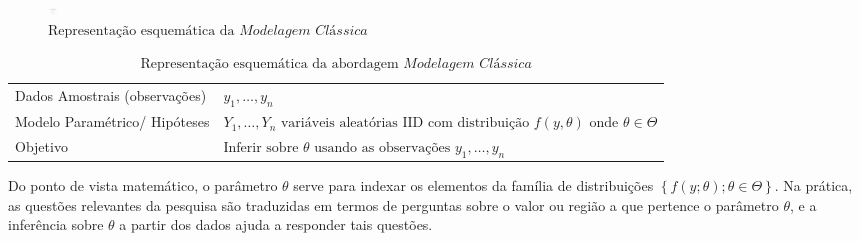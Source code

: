 \documentclass[
  12pt,
  brazilian,
]{book}
\theoremstyle{definition}
\theoremstyle{definition}
\theoremstyle{definition}
\theoremstyle{definition}
\theoremstyle{remark}
\begin{document}
\begin{figure}

{\centering \includegraphics[width=10,6in]{Figuras/Figura2.1} 

}

\caption{$\text{Representação esquemática da }\textit{Modelagem Clássica}$}\label{fig:modclas}
\end{figure}

\begin{table}[H]

\caption{\label{tab:modelclass}$\text{Representação esquemática da abordagem }\textit{Modelagem Clássica}$}
\centering
\begin{tabular}[t]{>{\raggedright\arraybackslash}p{4.5cm}l}
\toprule
Dados Amostrais (observações) & $y_1, \ldots, y_n$\\
Modelo Paramétrico/ Hipóteses & $Y_1, \ldots , Y_n 
     \text{ variáveis aleatórias IID com distribuição } f(y,\theta) \text{ onde } \theta \in \Theta$\\
Objetivo & $\text{Inferir sobre } \theta 
     \text{ usando as observações } y_1, \ldots, y_n$\\
\bottomrule
\end{tabular}
\end{table}

Do ponto de vista matemático, o parâmetro \(\theta\) serve para indexar os
elementos da família de distribuições \(\left\{f\left( y;\theta \right);\theta \in \Theta \right\}\).
Na prática, as questões relevantes da pesquisa são traduzidas em termos de perguntas sobre o valor
ou região a que pertence o parâmetro \(\theta\), e a inferência sobre \(\theta\) a partir dos dados ajuda a responder tais questões.
\end{document}
